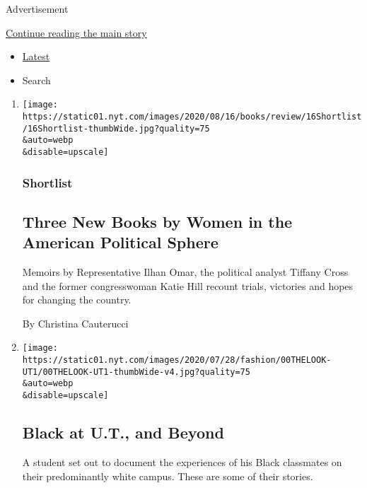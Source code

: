 Advertisement

\protect\hyperlink{after-mid1}{Continue reading the main story}

\begin{itemize}
\tightlist
\item
  \protect\hyperlink{stream-panel}{Latest}
\item
  Search
\end{itemize}

\begin{enumerate}
\def\labelenumi{\arabic{enumi}.}
\item
  \href{/2020/08/08/books/review/katie-hill-she-will-rise-ilhan-omar-tiffany-cross.html}{}

  \texttt{[image: https://static01.nyt.com/images/2020/08/16/books/review/16Shortlist/16Shortlist-thumbWide.jpg?quality=75\\\&auto=webp\\\&disable=upscale]}

  \hypertarget{shortlist}{%
  \subsubsection{Shortlist}\label{shortlist}}

  \hypertarget{three-new-books-by-women-in-the-american-political-sphere}{%
  \subsection{Three New Books by Women in the American Political
  Sphere}\label{three-new-books-by-women-in-the-american-political-sphere}}

  Memoirs by Representative Ilhan Omar, the political analyst Tiffany
  Cross and the former congresswoman Katie Hill recount trials,
  victories and hopes for changing the country.

  By Christina Cauterucci
\item
  \href{/2020/08/08/style/black-yearbook-university-texas-austin.html}{}

  \texttt{[image: https://static01.nyt.com/images/2020/07/28/fashion/00THELOOK-UT1/00THELOOK-UT1-thumbWide-v4.jpg?quality=75\\\&auto=webp\\\&disable=upscale]}

  \hypertarget{black-at-ut-and-beyond}{%
  \subsection{Black at U.T., and Beyond}\label{black-at-ut-and-beyond}}

  A student set out to document the experiences of his Black classmates
  on their predominantly white campus. These are some of their stories.


\end{enumerate}
